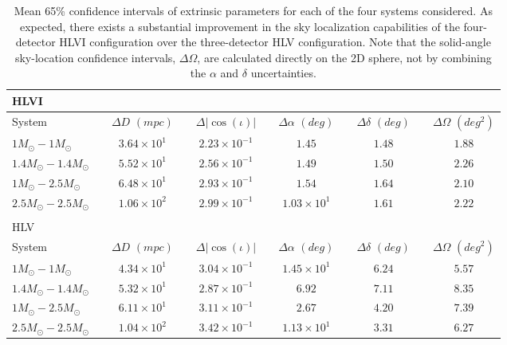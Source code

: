 \documentclass[11pt,a4paper]{emulateapj}
\begin{document}
 
\begin{table}[t!]
\centering
\caption{Mean 65\% confidence intervals of extrinsic parameters for each of the four systems considered.  As expected,
there exists a substantial improvement in the sky localization capabilities of the four-detector HLVI configuration over
the three-detector HLV configuration.  Note that the solid-angle sky-location confidence intervals, $\Delta\Omega$, are 
calculated directly on the 2D sphere, not by combining the $\alpha$ and $\delta$ uncertainties.}
\begin{tabular}{lcccccccccc}

\\HLVI\\
\hline\hline
 System & \vline & $\Delta D$ $(mpc)$ & \vline & $\Delta |\cos(\iota)|$ & \vline & $\Delta \alpha$ $(deg)$& \vline &  $\Delta \delta$   $(deg)$ & \vline & $\Delta\Omega$ $(deg^2)$\\
\hline\hline
 $1M_{\odot}-1M_{\odot}$ & \vline & $3.64\times 10^{1}$ & \vline & $2.23\times 10^{-1}$ & \vline & $1.45$ & \vline & $1.48$ & \vline & $1.88$\\
\hline
 $1.4M_{\odot}-1.4M_{\odot}$ & \vline & $5.52\times 10^{1}$ & \vline & $2.56\times 10^{-1}$ & \vline & $1.49$ & \vline & $1.50$ & \vline & $2.26$\\
\hline
 $1M_{\odot}-2.5M_{\odot}$  & \vline & $6.48\times 10^{1}$ & \vline & $2.93\times 10^{-1}$ & \vline & $1.54$ & \vline & $1.64$ & \vline & $2.10$\\
 \hline
 $2.5M_{\odot}-2.5M_{\odot}$ & \vline & $1.06\times 10^{2}$ & \vline & $2.99\times 10^{-1}$ & \vline & $1.03\times 10^{1}$ & \vline & $1.61$ & \vline & $2.22$\\
\hline\hline

\\
HLV\\

\hline\hline
 System & \vline & $\Delta D$ $(mpc)$ & \vline & $\Delta |\cos(\iota)|$ & \vline & $\Delta \alpha$ $(deg)$& \vline &  $\Delta \delta$   $(deg)$ & \vline & $\Delta\Omega$ $(deg^2)$\\
\hline\hline
 $1M_{\odot}-1M_{\odot}$ & \vline & $4.34\times 10^{1}$ & \vline & $3.04\times 10^{-1}$ & \vline & $1.45\times 10^{1}$ & \vline & $6.24$ & \vline & $5.57$\\
\hline
 $1.4M_{\odot}-1.4M_{\odot}$  & \vline & $5.32\times 10^{1}$ & \vline & $2.87\times 10^{-1}$ & \vline & $6.92$ & \vline & $7.11$ & \vline & $8.35$\\
\hline
  $1M_{\odot}-2.5M_{\odot}$& \vline & $6.11\times 10^{1}$ & \vline & $3.11\times 10^{-1}$ & \vline & $2.67$ & \vline & $4.20$ & \vline & $7.39$\\
\hline
 $2.5M_{\odot}-2.5M_{\odot}$ & \vline & $1.04\times 10^{2}$ & \vline & $3.42\times 10^{-1}$ & \vline & $1.13\times 10^{1}$ & \vline & $3.31$ & \vline & $6.27$\\
\hline\hline


\end{tabular}
\label{ciTableExtrinsic}
\end{table}
\end{document}
